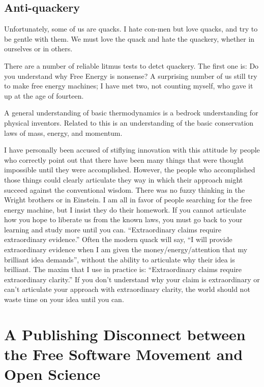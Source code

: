 \documentclass[
	fontsize=10pt, %
	twoside=false, %
	secnumdepth=1, %
]{kaobook}
\begin{document}
\section{Anti-quackery}

Unfortunately, some of us are quacks.
I hate con-men but love quacks, and try to be gentle with them.
We must love the quack and hate the quackery, whether in ourselves
or in others.

There are a number of reliable litmus tests to detct quackery.
The first one is: Do you understand why Free Energy is nonsense?
A surprising number of us still try to make free energy machines;
I have met two, not counting myself, who gave it up at the age of fourteen.

A general understanding of basic thermodynamics is a bedrock
understanding for physical inventors.
Related to this is an understanding of the basic conservation laws
of mass, energy, and momentum.

I have personally been accused of stiflying innovation with
this attitude by people who correctly point out that there have
been many things that were thought impossible until they were accomplished.
However, the people who accomplished those things could clearly
articulate they way in which their approach might succeed against
the conventional wisdom. There was no fuzzy thinking in the
Wright brothers or in Einstein. I am all in favor of
people searching for the free energy machine, but I insist
they do their homework.
If you cannot articulate how you hope to liberate us from the
known laws, you must go back to your learning and study more
until you can. ``Extraordinary claims require extraordinary
evidence.'' Often the modern quack will say, ``I will
provide extraordinary evidence when I am given the
money/energy/attention that my brilliant idea demands'',
without the ability to articulate why their idea is brilliant.
The maxim that I use in practice is: ``Extraordinary claims require
extraordinary clarity.''
If you don't understand why your claim is extraordinary or
can't articulate your approach with extraordinary clarity,
the world should not waste time on your idea until you can.

\chapter{A Publishing Disconnect between the Free Software Movement and Open Science}
\label{chap:publishdisconnect}
\end{document}
